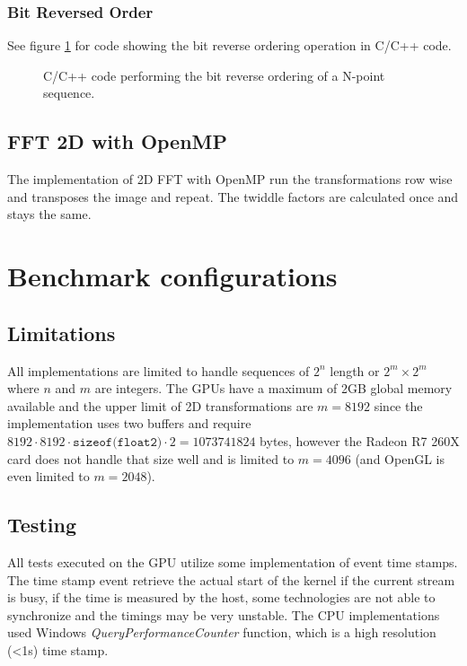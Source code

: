 \subsubsection{Bit Reversed Order}

See figure \ref{fig:omp:bit-reverse-order} for code showing the bit reverse ordering operation in C/C++ code.

\begin{figure}[h!]
	\centering
	\begin{framed}
			
	\end{framed}
	\caption{ C/C++ code performing the bit reverse ordering of a N-point sequence. }
	\label{fig:omp:bit-reverse-order}
\end{figure}

\subsection{FFT 2D with OpenMP}

The implementation of 2D FFT with OpenMP run the transformations row wise and transposes the image and repeat. The twiddle factors are calculated once and stays the same.

\section{Benchmark configurations}

\subsection{Limitations}

All implementations are limited to handle sequences of $2^n$ length or $2^m \times 2^m$ where $n$ and $m$ are integers. The GPUs have a maximum of 2GB global memory available and the upper limit of 2D transformations are $m = 8192$ since the implementation uses two buffers and require $8192 \cdot 8192 \cdot \texttt{sizeof(float2)} \cdot 2 = 1073741824$ bytes, however the Radeon R7 260X card does not handle that size well and is limited to $m = 4096$ (and OpenGL is even limited to $m = 2048$).

\subsection{Testing}

All tests executed on the GPU utilize some implementation of event time stamps. The time stamp event retrieve the actual start of the kernel if the current stream is busy, if the time is measured by the host, some technologies are not able to synchronize and the timings may be very unstable. The CPU implementations used Windows \textit{QueryPerformanceCounter} function, which is a high resolution (<1{\micro}s) time stamp.

